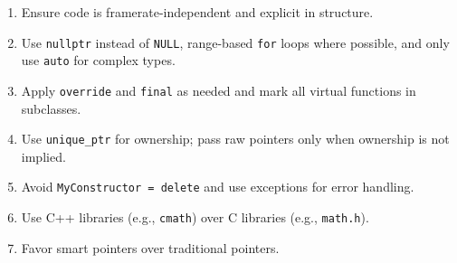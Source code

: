 \documentclass{article}
\begin{document}
\begin{enumerate}[left=0pt, align=left]
    \item Ensure code is framerate-independent and explicit in structure.

    \item Use \texttt{nullptr} instead of \texttt{NULL}, range-based \texttt{for} loops where possible, and only use \texttt{auto} for complex types.

    \item Apply \texttt{override} and \texttt{final} as needed and mark all virtual functions in subclasses.

    \item Use \texttt{unique\_ptr} for ownership; pass raw pointers only when ownership is not implied.

    \item Avoid \texttt{MyConstructor = delete} and use exceptions for error handling.

    \item Use C++ libraries (e.g., \texttt{cmath}) over C libraries (e.g., \texttt{math.h}).

    \item Favor smart pointers over traditional pointers.

\end{enumerate}
\end{document}
